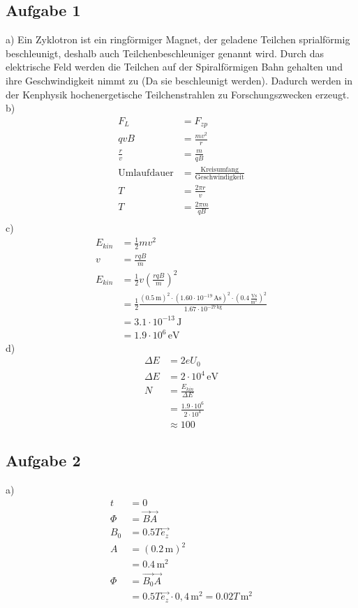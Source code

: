 \documentclass{article}
\begin{document}
\subsection*{Aufgabe 1}
a) Ein Zyklotron ist ein ringförmiger Magnet, der geladene Teilchen sprialförmig beschleunigt, deshalb auch Teilchenbeschleuniger genannt wird. Durch das elektrische Feld werden die Teilchen auf der Spiralförmigen Bahn gehalten und ihre Geschwindigkeit nimmt zu (Da sie beschleunigt werden). Dadurch werden in der Kenphysik hochenergetische Teilchenstrahlen zu Forschungszwecken erzeugt.\\
b)
\begin{align*}
    F_{L} &= F_{zp}\\
    qvB &= \frac{mv^2}{r}\\
    \frac{r}{v} &= \frac{m}{qB}\\
    \mathrm{Umlaufdauer} &= \frac{\mathrm{Kreisumfang}}{\mathrm{Geschwindigkeit}}\\
    T &= \frac{2\pi r}{v}\\
    T &= \frac{2\pi m}{qB}\\
\end{align*}
c) \begin{align*}
    E_{kin} &= \frac{1}{2} m v^2\\
    v &= \frac{rqB}{m}\\
    E_{kin} &= \frac{1}{2} v \left(\frac{rqB}{m}\right)^2\\
    &= \frac{1}{2} \frac{(0.5\,\mathrm{m})^2\cdot\left(1.60\cdot 10^{-19}\,\mathrm{As}\right)^2\cdot\left(0.4\,\mathrm{\frac{Vs}{m^2}}\right)^2}{1.67\cdot 10^{-27\,\mathrm{kg}}}\\
    &= 3.1\cdot 10^{-13}\,\mathrm{J}\\
    &= 1.9\cdot 10^6\,\mathrm{eV}
\end{align*}
d)
\begin{align*}
    \Delta E  &= 2eU_0\\
    \Delta E &= 2\cdot 10^4\,\mathrm{eV}\\
    N &= \frac{E_{kin}}{\Delta E}\\
    &= \frac{1.9\cdot 10^6}{2\cdot 10^4}\\
    &\approx 100
\end{align*}

\subsection*{Aufgabe 2}
a)\begin{align*}
    t &= 0\\
    \Phi &= \vec{B} \vec{A}\\
    B_0 &= 0.5 T\vec{e_z}\\
    A &= \left(0.2\,\mathrm{m}\right)^2\\
    &= 0.4\,\mathrm{m^2}\\
    \Phi &= \vec{B_0}\vec{A}\\
    &= 0.5 T\vec{e_z}\cdot 0,4\,\mathrm{m^2} = 0.02T\,\mathrm{m^2}
\end{align*}
\end{document}
